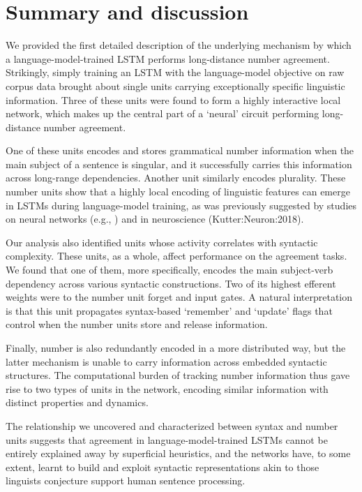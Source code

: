 \section{Summary and discussion}
We provided the first  detailed description of the underlying mechanism by which a language-model-trained LSTM performs long-distance  number agreement. %
Strikingly, simply training an LSTM with the language-model objective on raw corpus data brought about single units carrying exceptionally specific linguistic information. Three of these units were found to form a highly interactive local network, which makes up the central part of a `neural' circuit performing long-distance number agreement.

One of these units encodes and stores grammatical number information when the main subject of a sentence is singular, and it successfully carries this information across long-range dependencies. Another unit similarly encodes plurality. These number units show that a highly local encoding of linguistic features can emerge in LSTMs during language-model training, as was previously suggested by studies on neural networks (e.g., \cite{Bowers:2009}) and in neuroscience (Kutter:Neuron:2018).

Our analysis also identified units whose activity correlates with syntactic complexity. These units, as a whole, affect performance on the agreement tasks. We found that one of them, more specifically, encodes the main subject-verb dependency across various syntactic constructions. Two of its highest efferent weights were to the number unit forget and input gates. A natural interpretation is that this unit propagates syntax-based `remember' and `update' flags that control when the number units store and release information. %

Finally, number is also redundantly encoded in a more distributed way, but the latter mechanism is unable to carry information across embedded syntactic structures. The computational burden of tracking number information thus gave rise to two types of units in the network,  encoding similar information  with distinct properties and dynamics.

The relationship we uncovered and characterized between syntax and number units suggests that agreement in language-model-trained LSTMs cannot be entirely explained away by superficial heuristics, and the networks have, to some extent, learnt to build and exploit syntactic representations akin to those linguists conjecture support human sentence processing.

